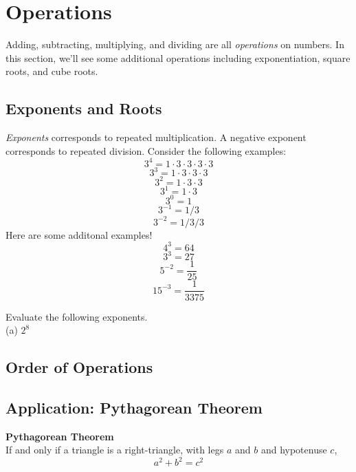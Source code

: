 \newpage 
\section{Operations}

Adding, subtracting, multiplying, and dividing are all \emph{operations} on numbers.  In this section, we'll see some additional operations including exponentiation, square roots, and cube roots.  

\subsection{Exponents and Roots} 
\emph{Exponents} corresponds to repeated multiplication.  
A negative exponent corresponds to repeated division.  
Consider the following examples:
\[ 3^{4} = 1 \cdot 3 \cdot 3 \cdot 3 \cdot 3   \]
\[ 3^{3} = 1 \cdot 3 \cdot 3 \cdot 3    \]
\[ 3^{2} = 1 \cdot 3 \cdot 3   \]
\[ 3^{1} = 1 \cdot 3    \]
\[ 3^{0} = 1    \]
\[ 3^{-1} = 1 / 3  \]
\[ 3^{-2} = 1 / 3 / 3 \]
Here are some additonal examples!
\[ 4^{3} = 64 \]
\[ 3^{3} = 27  \]
\[ 5^{-2} = \frac{1}{25}  \]
\[  15^{-3} = \frac{1}{3375} \]
\begin{exercise}
	Evaluate the following exponents.
	\\ \hspace*{15mm} (a) \( 2^{8} \)
	\label{ex:basicexponents}
\end{exercise}


\newpage 
\subsection{Order of Operations}


\newpage 
\subsection{Application: Pythagorean Theorem} 

\begin{theorem} \textbf{Pythagorean Theorem} \\ 
If and only if a triangle is a right-triangle, with legs \(a\) and \(b\) and hypotenuse \(c\),
\[a^2 + b^2 = c^2\]
\end{theorem}


